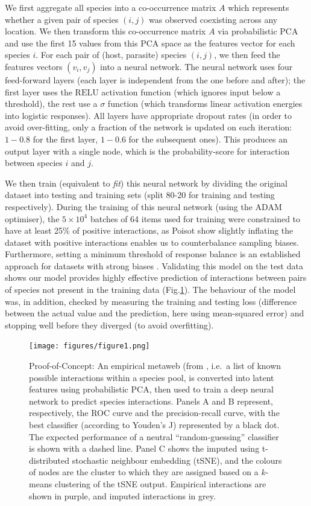 We first aggregate all species into a co-occurrence matrix \(A\) which
represents whether a given pair of species \((i,j)\) was observed
coexisting across any location. We then transform this co-occurrence
matrix \(A\) via probabilistic PCA \cite{Tipping1999ProPri} and use the
first 15 values from this PCA space as the features vector for each
species \(i\). For each pair of (host, parasite) species \((i,j)\), we
then feed the features vectors \((v_i, v_j)\) into a neural network. The
neural network uses four feed-forward layers (each layer is independent
from the one before and after); the first layer uses the \(\text{RELU}\)
activation function (which ignores input below a threshold), the rest
use a \(\sigma\) function (which transforms linear activation energies
into logistic responses). All layers have appropriate dropout rates (in
order to avoid over-fitting, only a fraction of the network is updated
on each iteration: \(1-0.8\) for the first layer, \(1-0.6\) for the
subsequent ones). This produces an output layer with a single node,
which is the probability-score for interaction between species \(i\) and
\(j\).

We then train (equivalent to \emph{fit}) this neural network by dividing
the original dataset into testing and training sets (split 80-20 for
training and testing respectively). During the training of this neural
network (using the ADAM optimiser), the \(5\times 10^4\) batches of 64
items used for training were constrained to have at least 25\% of
positive interactions, as Poisot\cite{Poisot2021ImpMam} show slightly inflating the
dataset with positive interactions enables us to counterbalance sampling
biases. Furthermore, setting a minimum threshold of response balance is
an established approach for datasets with strong biases
\cite{Lemaitre2017ImbPyt}. Validating this model on the test data shows
our model provides highly effective prediction of interactions between
pairs of species not present in the training data (Fig.\ref{fig:example}). The
behaviour of the model was, in addition, checked by measuring the
training and testing loss (difference between the actual value and the
prediction, here using mean-squared error) and stopping well before they
diverged (to avoid overfitting).

\begin{figure}[h]
    \centering
    \texttt{[image: figures/figure1.png]}
    \caption{Proof-of-Concept: An empirical metaweb (from
\cite{Hadfield2014TalTwo}, i.e.~a list of known possible interactions
within a species pool, is converted into latent features using
probabilistic PCA, then used to train a deep neural network to predict
species interactions. Panels A and B represent, respectively, the ROC
curve and the precision-recall curve, with the best classifier
(according to Youden's J) represented by a black dot. The expected
performance of a neutral ``random-guessing'' classifier is shown with a
dashed line. Panel C shows the imputed using t-distributed stochastic
neighbour embedding (tSNE), and the colours of nodes are the cluster to
which they are assigned based on a \(k\)-means clustering of the tSNE
output. Empirical interactions are shown in purple, and imputed
interactions in grey.}
    \label{fig:example}
\end{figure}

